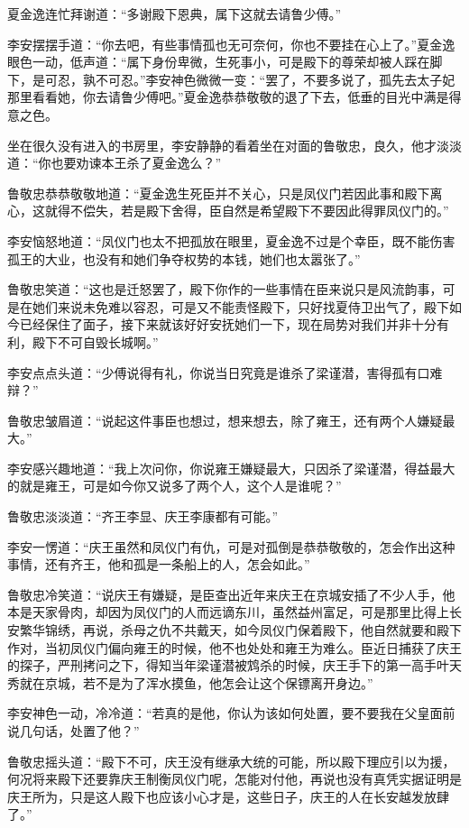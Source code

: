 夏金逸连忙拜谢道：“多谢殿下恩典，属下这就去请鲁少傅。”

李安摆摆手道：“你去吧，有些事情孤也无可奈何，你也不要挂在心上了。”夏金逸眼色一动，低声道：“属下身份卑微，生死事小，可是殿下的尊荣却被人踩在脚下，是可忍，孰不可忍。”李安神色微微一变：“罢了，不要多说了，孤先去太子妃那里看看她，你去请鲁少傅吧。”夏金逸恭恭敬敬的退了下去，低垂的目光中满是得意之色。

坐在很久没有进入的书房里，李安静静的看着坐在对面的鲁敬忠，良久，他才淡淡道：“你也要劝谏本王杀了夏金逸么？”

鲁敬忠恭恭敬敬地道：“夏金逸生死臣并不关心，只是凤仪门若因此事和殿下离心，这就得不偿失，若是殿下舍得，臣自然是希望殿下不要因此得罪凤仪门的。”

李安恼怒地道：“凤仪门也太不把孤放在眼里，夏金逸不过是个幸臣，既不能伤害孤王的大业，也没有和她们争夺权势的本钱，她们也太嚣张了。”

鲁敬忠笑道：“这也是迁怒罢了，殿下你作的一些事情在臣来说只是风流韵事，可是在她们来说未免难以容忍，可是又不能责怪殿下，只好找夏侍卫出气了，殿下如今已经保住了面子，接下来就该好好安抚她们一下，现在局势对我们并非十分有利，殿下不可自毁长城啊。”

李安点点头道：“少傅说得有礼，你说当日究竟是谁杀了梁谨潜，害得孤有口难辩？”

鲁敬忠皱眉道：“说起这件事臣也想过，想来想去，除了雍王，还有两个人嫌疑最大。”

李安感兴趣地道：“我上次问你，你说雍王嫌疑最大，只因杀了梁谨潜，得益最大的就是雍王，可是如今你又说多了两个人，这个人是谁呢？”

鲁敬忠淡淡道：“齐王李显、庆王李康都有可能。”

李安一愣道：“庆王虽然和凤仪门有仇，可是对孤倒是恭恭敬敬的，怎会作出这种事情，还有齐王，他和孤是一条船上的人，怎会如此。”

鲁敬忠冷笑道：“说庆王有嫌疑，是臣查出近年来庆王在京城安插了不少人手，他本是天家骨肉，却因为凤仪门的人而远谪东川，虽然益州富足，可是那里比得上长安繁华锦绣，再说，杀母之仇不共戴天，如今凤仪门保着殿下，他自然就要和殿下作对，当初凤仪门偏向雍王的时候，他不也处处和雍王为难么。臣近日捕获了庆王的探子，严刑拷问之下，得知当年梁谨潜被鸩杀的时候，庆王手下的第一高手叶天秀就在京城，若不是为了浑水摸鱼，他怎会让这个保镖离开身边。”

李安神色一动，冷冷道：“若真的是他，你认为该如何处置，要不要我在父皇面前说几句话，处置了他？”

鲁敬忠摇头道：“殿下不可，庆王没有继承大统的可能，所以殿下理应引以为援，何况将来殿下还要靠庆王制衡凤仪门呢，怎能对付他，再说也没有真凭实据证明是庆王所为，只是这人殿下也应该小心才是，这些日子，庆王的人在长安越发放肆了。”

